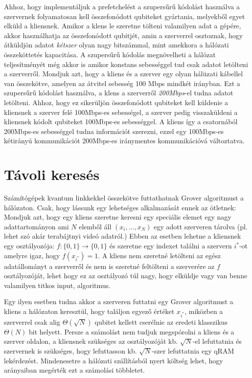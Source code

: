 \indent Ahhoz, hogy implementáljuk a prefetchelést a szupersűrű kódolást használva a szervernek folyamatosan kell összefonódott qubiteket gyártania, melyekből egyet elküld a kliensnek.
Amikor a klens le szeretne tölteni valamilyen adat a gépére, akkor használhatja az összefonódott qubitjét, amin a szerverrel osztoznak, hogy átküldjön adatot \textit{kétszer} olyan nagy bitszámmal, mint amekkora a hálózati összeköttetés kapacitása.
A szupersűrű kódolás megnövelheti a hálózat teljesítményét még akkor is amikor konstans sebességgel tud csak adatot letölteni a szerverről.
Mondjuk azt, hogy a kliens és a szerver egy olyan hálüzati kábellel van összekötve, amelyen az átvitel sebesség 100 Mbps mindkét irányban.
Ezt a szupersűrű kódolást használva, a klens a szerverről \textit{200Mbps}-el tudna adatot letölteni.
Ahhoz, hogy ez sikerüljön összefonódott qubiteket kell küldenie a kliensnek a szerver felé 100Mbps-es sebességel, a szerver pedig visszaküldeni a kliensnek kódolt qubiteket 100Mbps-es sebességgel.
A kliens így a csatornából 200Mbps-es sebességgel tudna információt szerezni, ezzel egy 100Mbps-es kétirányú kommunikációt 200Mbps-es iránymentes kommunikációvá változtatva.
 

\section{Távoli keresés}
\hspace{2mm} Számítógépek kvantum linkkekkel összekötve futtathatnak Grover algoritmust a hálózaton.
Csak, hogy lássunk egy lehetséges alkalmazását ennek az ötletnek: Mondjuk azt, hogy egy kliens szeretne keresni egy speciális elemet egy nagy adattartományon ami $N$ elemből áll $(x_i,...,x_N)$ egy adott szerveren tárolva (pl. lehet szó akár terabájtnyi videó adatról.)
Ebben az esetben lehetne a kliensnek egy osztályozója: $f:\{0,1\}\rightarrow \{0,1\}$ és szeretne egy indexet találni a szervern $i^*$-ot amelyre igaz, hogy $f(x_{i^*})=1$.
A kliens nem szeretné letölteni az egész adatállományt a szerverről és nem is szeretné feltölteni a szerverére az $f$ osztályozóját, lehet hogy ez az osztályozó túl nagy, hogy elküldje vagy van benne valamilyen titkos input, algoritmus.

\indent Egy ilyen esetben tudna akkor a szerveren futtatni egy Grover algoritmust a kliens a hálózaton keresztül, hogy találjon egyező értéket $x_{i^*}$, miközben a szerverrel csak alig $\Theta(\sqrt{N})$ qubitet kellett cserélnie az eredeti klasszikus $\Theta(N)$ bit helyett.
Persze a számolást nem tudjuk megspórolni a kliens és a szerver oldalon, a kliensnek szükséges az osztályozóját kb. $\sqrt{N}$-el lefuttatnia és szervernek is szükséges, hogy lefuttasson kb. $\sqrt{N}$-szer lefuttatnia egy qRAM lekérdezést.
Mindenesetre a hálózati szállításból nyert költség lehet, hogy arányaiban megérték ezt a számolási többletet.